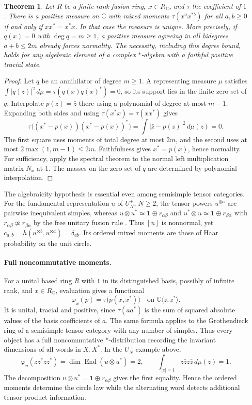 \documentclass[11pt,reqno]{amsart}
\newtheorem{theorem}{Theorem}[section]
\theoremstyle{definition}
\newcommand{\End}{\operatorname{End}}
\newcommand{\one}{\mathbf 1}
\newcommand{\CC}{\mathbb C}
\begin{document}
\begin{theorem}\label{thm:ordered-normal}
Let $R$ be a finite-rank fusion ring, $x\in R_{\CC}$, and $\tau$ the coefficient of $1$.
There is a positive measure on $\CC$ with mixed moments
$\tau(x^a x^{*b})$ for all $a,b\geq0$ if and only if $xx^*=x^*x$.
In that case the measure is unique. More precisely, if $q(x)=0$ with $\deg q=m\ge1$, a positive measure agreeing in all bidegrees $a+b\le2m$ already forces normality. The necessity, including this degree bound, holds for any algebraic element of a complex $*$-algebra with a faithful positive tracial state.
\end{theorem}
\begin{proof}
Let $q$ be an annihilator of degree $m\ge1$. A representing measure $\mu$ satisfies
$\int |q(z)|^2\,d\mu=\tau(q(x)q(x)^*)=0$, so its support lies in the
finite zero set of $q$. Interpolate $p(z)=\bar z$ there using a polynomial of degree at most $m-1$. Expanding both sides and using $\tau(x^*x)=\tau(xx^*)$ gives
\[
 \tau\big((x^*-p(x))(x^*-p(x))^*\big)
       =\int |\bar z-p(z)|^2\,d\mu(z)=0.
\]
The first square uses moments of total degree at most $2m$, and the second uses at most $2\max(1,m-1)\le2m$. Faithfulness gives $x^*=p(x)$, hence normality. For sufficiency,
apply the spectral theorem to the normal left multiplication matrix $N_x$ at $1$.
The masses on the zero set of $q$ are determined by polynomial interpolation.
\end{proof}

The algebraicity hypothesis is essential even among semisimple tensor categories.
For the fundamental representation $u$ of $U_N^+$, $N\geq2$, the tensor powers
$u^{\otimes a}$ are pairwise inequivalent simples, whereas
$u\otimes u^*\simeq\one\oplus r_{\alpha\beta}$ and
$u^*\otimes u\simeq\one\oplus r_{\beta\alpha}$ with
$r_{\alpha\beta}\not\simeq r_{\beta\alpha}$
by the free unitary fusion rule \cite[Theorem~1]{BanU}.
Thus $[u]$ is nonnormal, yet $c_{a,b}=h(u^{\otimes b},u^{\otimes a})=\delta_{ab}$.
Its ordered mixed moments are those of Haar probability on the unit circle.

\paragraph{Full noncommutative moments.}
For a unital based ring $R$ with $1$ in its distinguished basis, possibly of infinite rank, and $x\in R_{\CC}$, evaluation gives a functional
\[
 \varphi_x(p)=\tau\bigl(p(x,x^*)\bigr)
 \quad\text{on }\CC\langle z,z^*\rangle.
\]
It is unital, tracial and positive, since $\tau(aa^*)$ is the sum of squared absolute values of the basis coefficients of $a$. The same formula applies to the Grothendieck ring of a semisimple tensor category with any number of simples. Thus every object has a full noncommutative $*$-distribution recording the invariant dimensions of all words in $X,X^*$. In the $U_N^+$ example above,
\[
 \varphi_u(zz^*zz^*)=\dim\End(u\otimes u^*)=2,
 \qquad \int_{|z|=1}z\bar z z\bar z\,d\mu(z)=1.
\]
The decomposition $u\otimes u^*=\one\oplus r_{\alpha\beta}$ gives the first equality. Hence the ordered moments determine the circle law while the alternating word detects additional tensor-product information.
\end{document}
